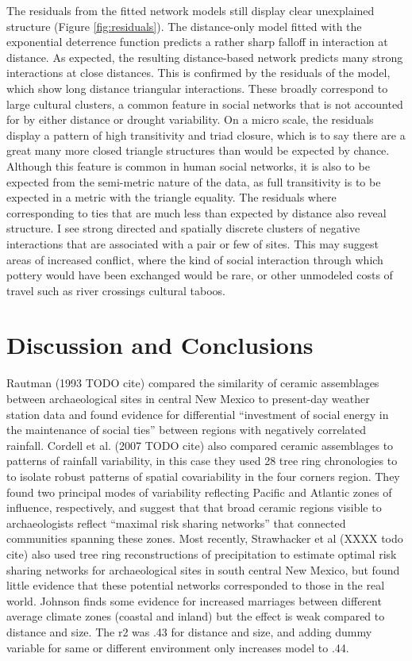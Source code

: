 \documentclass[11pt]{wlscirep}
\begin{document}
The residuals from the fitted network models still display clear unexplained structure (Figure \ref{fig:residuals}). The distance-only model fitted with the exponential deterrence function predicts a rather sharp falloff in interaction at distance. As expected, the resulting distance-based network predicts many strong interactions at close distances. This is confirmed by the residuals of the model, which show long distance triangular interactions. These broadly correspond to large cultural clusters, a common feature in social networks that is not accounted for by either distance or drought variability. On a micro scale, the residuals display a pattern of high transitivity and triad closure, which is to say there are a great many more closed triangle structures than would be expected by chance. Although this feature is common in human social networks, it is also to be expected from the semi-metric nature of the data, as full transitivity is to be expected in a metric with the triangle equality. The residuals where corresponding to ties that are much less than expected by distance also reveal structure. I see strong directed and spatially discrete clusters of negative interactions that are associated with a pair or few of sites. This may suggest areas of increased conflict, where the kind of social interaction through which pottery would have been exchanged would be rare, or other unmodeled costs of travel such as river crossings cultural taboos. 



\section*{Discussion and Conclusions}
Rautman (1993 TODO cite) compared the similarity of ceramic assemblages between archaeological sites in central New Mexico to present-day weather station data and found evidence for differential ``investment of social energy in the maintenance of social ties'' between regions with negatively correlated rainfall. Cordell et al. (2007 TODO cite) also compared ceramic assemblages to patterns of rainfall variability, in this case they used 28 tree ring chronologies to to isolate robust patterns of spatial covariability in the four corners region. They found two principal modes of variability reflecting Pacific and Atlantic zones of influence, respectively, and suggest that that broad ceramic regions visible to archaeologists reflect ``maximal risk sharing networks'' that connected communities spanning these zones. Most recently, Strawhacker et al (XXXX todo cite) also used tree ring reconstructions of precipitation to estimate optimal risk sharing networks for archaeological sites in south central New Mexico, but found little evidence that these potential networks corresponded to those in the real world. Johnson finds some evidence for increased marriages between different average climate zones (coastal and inland) but the effect is weak compared to distance and  size. The r2 was .43 for distance and size, and adding dummy variable for same or different environment only increases model to .44.
\end{document}
